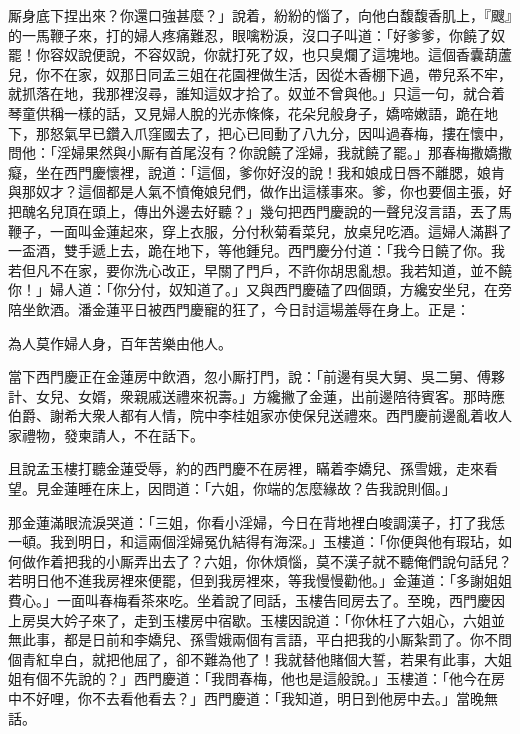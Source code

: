 厮身底下捏出來？你還口強甚麼？」說着，紛紛的惱了，向他白馥馥香肌上，『颼』的一馬鞭子來，打的婦人疼痛難忍，眼噙粉淚，沒口子叫道：「好爹爹，你饒了奴罷！你容奴說便說，不容奴說，你就打死了奴，也只臭爛了這塊地。這個香囊葫蘆兒，你不在家，奴那日同孟三姐在花園裡做生活，因從木香棚下過，帶兒系不牢，就抓落在地，{}我那裡沒尋，誰知這奴才拾了。奴並不曾與他。」{}只這一句，就合着琴童供稱一樣的話，又見婦人脫的光赤條條，花朵兒般身子，嬌啼嫩語，跪在地下，那怒氣早已鑽入爪窪國去了，把心已囘動了八九分，因叫過春梅，摟在懷中，問他：{}「淫婦果然與小厮有首尾沒有？你說饒了淫婦，我就饒了罷。」那春梅撒嬌撒癡，坐在西門慶懷裡，說道：「這個，爹你好沒的說！我和娘成日唇不離腮，娘肯與那奴才？這個都是人氣不憤俺娘兒們，做作出這樣事來。爹，你也要個主張，好把醜名兒頂在頭上，傳出外邊去好聽？」{}幾句把西門慶說的一聲兒沒言語，丟了馬鞭子，一面叫金蓮起來，穿上衣服，{}分付秋菊看菜兒，放桌兒吃酒。這婦人滿斟了一盃酒，雙手遞上去，跪在地下，等他鍾兒。西門慶分付道：「我今日饒了你。我若但凡不在家，要你洗心改正，早關了門戶，不許你胡思亂想。我若知道，並不饒你！」婦人道：「你分付，奴知道了。」{}又與西門慶磕了四個頭，方纔安坐兒，在旁陪坐飲酒。潘金蓮平日被西門慶寵的狂了，今日討這場羞辱在身上。正是：

\begin{myquote}
為人莫作婦人身，百年苦樂由他人。
\end{myquote}

當下西門慶正在金蓮房中飲酒，忽小厮打門，說：「前邊有吳大舅、吳二舅、傅夥計、女兒、女婿，衆親戚送禮來祝壽。」方纔撇了金蓮，出前邊陪待賓客。那時應伯爵、謝希大衆人都有人情，院中李桂姐家亦使保兒送禮來。{}西門慶前邊亂着收人家禮物，發柬請人，不在話下。

且說孟玉樓打聽金蓮受辱，約的西門慶不在房裡，瞞着李嬌兒、孫雪娥，走來看望。見金蓮睡在床上，因問道：「六姐，你端的怎麼緣故？告我說則個。」

那金蓮滿眼流淚哭道：「三姐，你看小淫婦，今日在背地裡白唆調漢子，打了我恁一頓。我到明日，和這兩個淫婦冤仇結得有海深。」{}玉樓道：「你便與他有瑕玷，如何做作着把我的小厮弄出去了？六姐，你休煩惱，莫不漢子就不聽俺們說句話兒？若明日他不進我房裡來便罷，但到我房裡來，等我慢慢勸他。」金蓮道：「多謝姐姐費心。」一面叫春梅看茶來吃。坐着說了囘話，玉樓告囘房去了。至晚，西門慶因上房吳大妗子來了，走到玉樓房中宿歇。玉樓因說道：「你休枉了六姐心，六姐並無此事，都是日前和李嬌兒、孫雪娥兩個有言語，平白把我的小厮紮罰了。你不問個青紅皁白，就把他屈了，卻不難為他了！我就替他賭個大誓，若果有此事，大姐姐有個不先說的？」{}西門慶道：「我問春梅，他也是這般說。」{}玉樓道：「他今在房中不好哩，你不去看他看去？」西門慶道：「我知道，明日到他房中去。」當晚無話。

